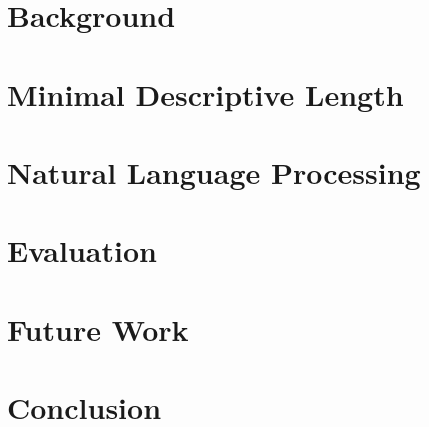 \documentclass{sig-alternate-05-2015}
\begin{document}
\section{Background} \label{sec:background}


\section{Minimal Descriptive Length} \label{sec:mdl}


\section{Natural Language Processing} \label{sec:nlp}


\section{Evaluation} \label{sec:experiments}


\section{Future Work} \label{sec:future}


\section{Conclusion} \label{sec:conclusion}


%

%

%
%

\end{document}
